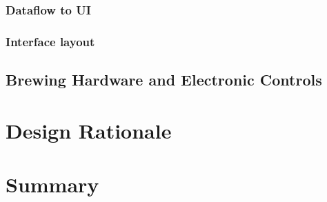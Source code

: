 \documentclass[draftclsnofoot,onecolumn,letterpaper,10pt]{IEEEtran}
\begin{document}
\subsubsection{Dataflow to UI}

\subsubsection{Interface layout}


\subsection{Brewing Hardware and Electronic Controls} %

\section{Design Rationale}

\section{Summary}



\end{document}
